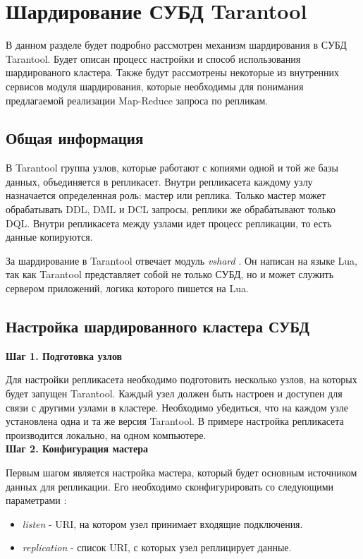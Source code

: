 \section{Шардирование СУБД Tarantool}

В данном разделе будет подробно рассмотрен механизм шардирования в СУБД
Tarantool. Будет описан процесс настройки и способ использования шардированого
кластера. Также будут рассмотрены некоторые из внутренних сервисов модуля
шардирования, которые необходимы для понимания предлагаемой реализации
Map-Reduce запроса по репликам.

\subsection{Общая информация}

В Tarantool группа узлов, которые работают с копиями одной и той же базы
данных, объединяется в репликасет. Внутри репликасета каждому узлу назначается
определенная роль: мастер или реплика. Только мастер может обрабатывать DDL,
DML и DCL запросы, реплики же обрабатывают только DQL. Внутри репликасета
между узлами идет процесс репликации, то есть данные копируются.

За шардирование в Tarantool отвечает модуль \textit{vshard}
\cite{VshardGithub}. Он написан на языке Lua, так как Tarantool представляет
собой не только СУБД, но и может служить сервером приложений, логика которого
пишется на Lua.

\subsection{Настройка шардированного кластера СУБД}

\textbf{Шаг 1. Подготовка узлов}

Для настройки репликасета необходимо подготовить несколько узлов, на которых будет запущен Tarantool. Каждый узел должен быть настроен и доступен для связи с другими узлами в кластере. Необходимо убедиться, что на каждом узле установлена одна и та же версия Tarantool. В примере настройка репликасета производится локально, на одном компьютере. \\

\textbf{Шаг 2. Конфигурация мастера}

Первым шагом является настройка мастера, который будет основным источником данных для репликации. Его необходимо сконфигурировать со следующими параметрами \cite{TarantoolDoc}:

\begin{itemize}
    \item \textit{listen} - URI, на котором узел принимает входящие подключения.
    \item \textit{replication} - список URI, с которых узел реплицирует данные.
\end{itemize}

